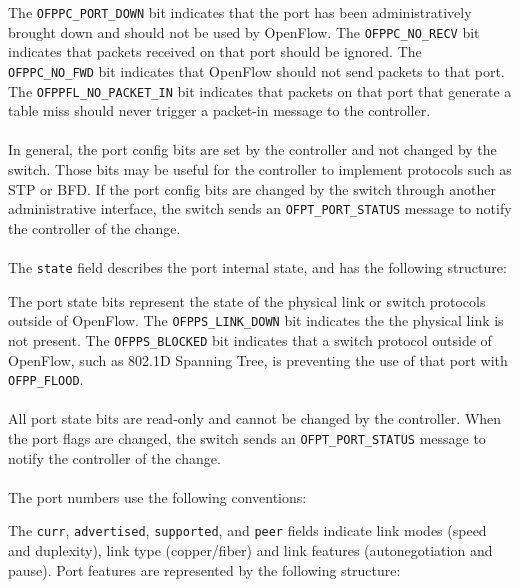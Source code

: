 
The \verb|OFPPC_PORT_DOWN| bit indicates that the port has been administratively brought down and should not be used by OpenFlow. The \verb|OFPPC_NO_RECV| bit indicates that packets received on that port should be ignored. The \verb|OFPPC_NO_FWD| bit indicates that OpenFlow should not send packets to that port. The \verb|OFPPFL_NO_PACKET_IN| bit indicates that packets on that port that generate a table miss should never trigger a packet-in message to the controller.
\\\\
In general, the port config bits are set by the controller and not changed by the switch. Those bits may be useful for the controller to implement protocols such as STP or BFD. If the port config bits are changed by the switch through another administrative interface, the switch sends an \verb|OFPT_PORT_STATUS| message to notify the controller of the change.
\\\\
The \verb|state| field describes the port internal state, and has the following structure:


The port state bits represent the state of the physical link or switch protocols outside of OpenFlow. The \verb|OFPPS_LINK_DOWN| bit indicates the the physical link is not present. The \verb|OFPPS_BLOCKED| bit indicates that a switch protocol outside of OpenFlow, such as 802.1D Spanning Tree, is preventing the use of that port with \verb|OFPP_FLOOD|.
\\\\
All port state bits are read-only and cannot be changed by the controller. When the port flags are changed, the switch sends an \verb|OFPT_PORT_STATUS| message to notify the controller of the change.
\\\\
The port numbers use the following conventions:


The \verb|curr|, \verb|advertised|, \verb|supported|, and \verb|peer| fields indicate link modes (speed and duplexity), link type (copper/fiber) and link features (autonegotiation and pause).  Port features are represented by the following structure:

